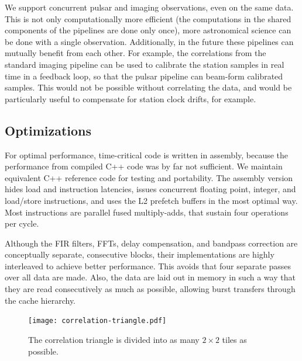 \documentclass{sig-alternate}
\begin{document}
We support concurrent pulsar and imaging observations, even on the same data.
This is not only computationally more efficient (the computations in the
shared components of the pipelines are done only once), more astronomical
science can be done with a single observation.
Additionally, in the future these pipelines can mutually benefit from each
other.
For example, the correlations from the standard imaging pipeline can be used
to calibrate the station samples in real time in a feedback loop, so that the
pulsar pipeline can beam-form calibrated samples.
This would not be possible without correlating the data, and would be
particularly useful to compensate for station clock drifts, for example.


\subsection{Optimizations}

For optimal performance, time-critical code is written in assembly,
because the performance from compiled C++ code was by far not sufficient.
We maintain equivalent C++ reference code for testing and portability.
The assembly version hides load and instruction latencies, issues concurrent
floating point, integer, and load/store instructions,
and uses the L2 prefetch buffers in the most optimal way.
Most instructions are parallel fused multiply-adds, that sustain four
operations per cycle.

Although the FIR filters, FFTs, delay compensation, and bandpass correction
are conceptually separate, consecutive blocks, their implementations are
highly interleaved to achieve better performance.
This avoids that four separate passes over all data are made.
Also, the data are laid out in memory in such a way that they are read
consecutively as much as possible, allowing burst transfers through the
cache hierarchy.

\begin{figure}[ht]
\begin{center}
\texttt{[image: correlation-triangle.pdf]}
\end{center}
\caption{The correlation triangle is divided into as many $2\times2$ tiles as possible.}
\label{fig:correlation-triangle}
\end{figure}
\end{document}
